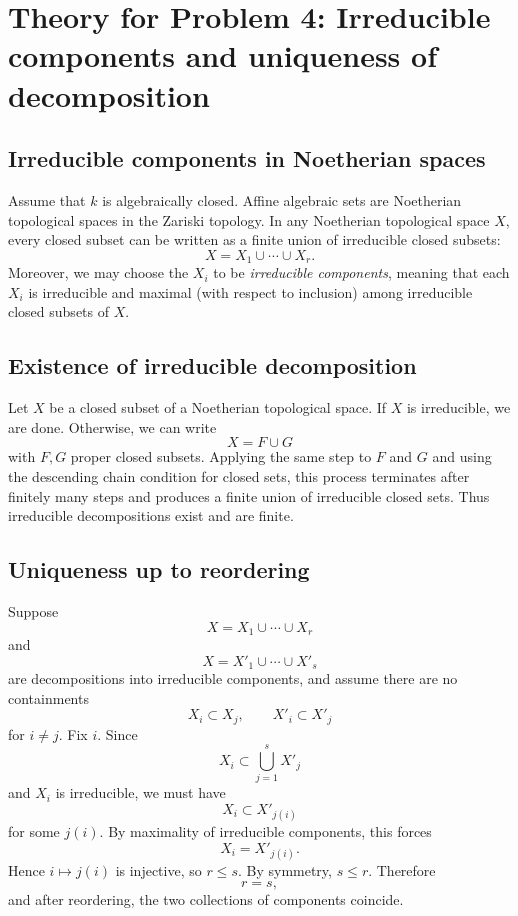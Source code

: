 \documentclass[12pt,a4paper]{article}
\theoremstyle{plain}
\theoremstyle{definition}      %
\begin{document}
\section*{Theory for Problem 4: Irreducible components and uniqueness of decomposition}

\subsection*{Irreducible components in Noetherian spaces}

Assume that $k$ is algebraically closed.
Affine algebraic sets are Noetherian topological spaces in the Zariski topology.
In any Noetherian topological space $X$, every closed subset can be written as a finite union of irreducible closed subsets:
\[
X
=
X_1\cup\cdots\cup X_r.
\]
Moreover, we may choose the $X_i$ to be \emph{irreducible components}, meaning that each $X_i$ is irreducible and maximal (with respect to inclusion) among irreducible closed subsets of $X$.

\subsection*{Existence of irreducible decomposition}

Let $X$ be a closed subset of a Noetherian topological space.
If $X$ is irreducible, we are done.
Otherwise, we can write
\[
X=F\cup G
\]
with $F,G$ proper closed subsets.
Applying the same step to $F$ and $G$ and using the descending chain condition for closed sets, this process terminates after finitely many steps and produces a finite union of irreducible closed sets.
Thus irreducible decompositions exist and are finite.

\subsection*{Uniqueness up to reordering}

Suppose
\[
X=X_1\cup\cdots\cup X_r
\]
and
\[
X=X'_1\cup\cdots\cup X'_s
\]
are decompositions into irreducible components, and assume there are no containments
\[
X_i\subset X_j,
\qquad
X'_i\subset X'_j
\]
for $i\neq j$.
Fix $i$.
Since
\[
X_i
\subset
\bigcup_{j=1}^s X'_j
\]
and $X_i$ is irreducible, we must have
\[
X_i\subset X'_{j(i)}
\]
for some $j(i)$.
By maximality of irreducible components, this forces
\[
X_i=X'_{j(i)}.
\]
Hence $i\mapsto j(i)$ is injective, so $r\le s$.
By symmetry, $s\le r$.
Therefore
\[
r=s,
\]
and after reordering, the two collections of components coincide.
\end{document}
